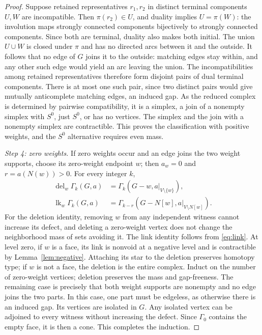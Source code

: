 \documentclass[11pt,a4paper]{article}
\theoremstyle{definition}
\newcommand{\lk}{\operatorname{lk}}
\newcommand{\del}{\operatorname{del}}
\newcommand{\G}{\Gamma}
\begin{document}
\begin{proof}
Suppose retained representatives $r_1,r_2$ in distinct terminal components $U,W$ are incompatible. Then $\pi(r_2)\in U$, and duality implies $U=\pi(W)$: the involution maps strongly connected components bijectively to strongly connected components. Since both are terminal, duality also makes both initial. The union $U\cup W$ is closed under $\pi$ and has no directed arcs between it and the outside. It follows that no edge of $G$ joins it to the outside: matching edges stay within, and any other such edge would yield an arc leaving the union. The incompatibilities among retained representatives therefore form disjoint pairs of dual terminal components. There is at most one such pair, since two distinct pairs would give mutually anticomplete matching edges, an induced gap. As the reduced complex is determined by pairwise compatibility, it is a simplex, a join of a nonempty simplex with $S^0$, just $S^0$, or has no vertices. The simplex and the join with a nonempty simplex are contractible. This proves the classification with positive weights, and the $S^0$ alternative requires even mass.

\emph{Step 4: zero weights.} If zero weights occur and an edge joins the two weight supports, choose its zero-weight endpoint $w$; then $a_w=0$ and $r=a(N(w))>0$. For every integer $k$,
\begin{align}
 \del_w\G_k(G,a)&=\G_k(G-w,a|_{V\setminus\{w\}}),\label{eq:delzero}\\
 \lk_w\G_k(G,a)&=\G_{k-r}(G-N[w],a|_{V\setminus N[w]}).\label{eq:linkzero}
\end{align}
For the deletion identity, removing $w$ from any independent witness cannot increase its defect, and deleting a zero-weight vertex does not change the neighborhood mass of sets avoiding it. The link identity follows from \eqref{eq:link}. At level zero, if $w$ is a face, its link is nonvoid at a negative level and is contractible by Lemma~\ref{lem:negative}. Attaching its star to the deletion preserves homotopy type; if $w$ is not a face, the deletion is the entire complex. Induct on the number of zero-weight vertices; deletion preserves the mass and gap-freeness. The remaining case is precisely that both weight supports are nonempty and no edge joins the two parts. In this case, one part must be edgeless, as otherwise there is an induced gap. Its vertices are isolated in $G$. Any isolated vertex can be adjoined to every witness without increasing the defect. Since $\G_0$ contains the empty face, it is then a cone. This completes the induction.
\end{proof}
\end{document}
